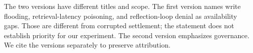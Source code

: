The two versions have different titles and scope. The first version names
write flooding, retrieval-latency poisoning, and reflection-loop denial as
availability gaps. Those are different from corrupted settlement; the
statement does not establish priority for our experiment. The second version
emphasizes governance. We cite the versions separately to preserve attribution.
